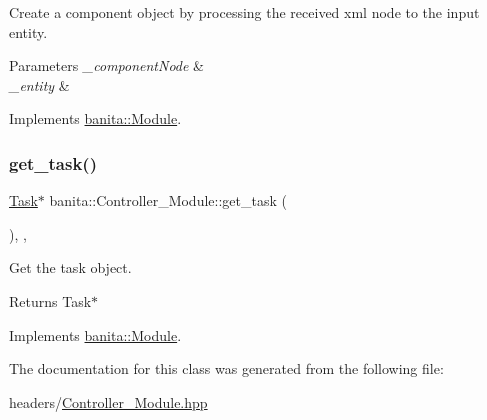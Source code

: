 Create a component object by processing the received xml node to the input entity. 


\begin{DoxyParams}{Parameters}
{\em \+\_\+component\+Node} & \\
\hline
{\em \+\_\+entity} & \\
\hline
\end{DoxyParams}


Implements \mbox{\hyperlink{classbanita_1_1_module_ace6d7ce15d60044f233d30a43dc961dd}{banita\+::\+Module}}.

\mbox{\label{classbanita_1_1_controller___module_a8868454d67a5f949b401c9cfc0a12eba}} 
\subsubsection{\texorpdfstring{get\_task()}{get\_task()}}
{\footnotesize\ttfamily \mbox{\hyperlink{classbanita_1_1_task}{Task}}$\ast$ banita\+::\+Controller\+\_\+\+Module\+::get\+\_\+task (\begin{DoxyParamCaption}{ }\end{DoxyParamCaption})\hspace{0.3cm}{\ttfamily [inline]}, {\ttfamily [override]}, {\ttfamily [virtual]}}



Get the task object. 

\begin{DoxyReturn}{Returns}
Task$\ast$ 
\end{DoxyReturn}


Implements \mbox{\hyperlink{classbanita_1_1_module_a8e29c0b6d7e11a39dac3c0879ef513d9}{banita\+::\+Module}}.



The documentation for this class was generated from the following file\+:\begin{DoxyCompactItemize}
\item 
headers/\mbox{\hyperlink{_controller___module_8hpp}{Controller\+\_\+\+Module.\+hpp}}\end{DoxyCompactItemize}
